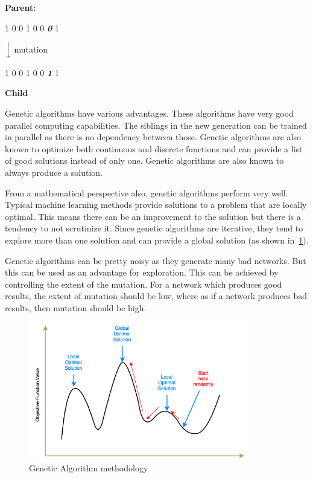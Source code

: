 \begin{itemize}
    \clearpage
    
    \textbf{Parent}: 
    
    1 0 0 1 0 0 \textbf{\textsl{0}} 1
    
    \qquad\quad\qquad$\Big\downarrow$ mutation
    
    1 0 0 1 0 0 \textbf{\textsl{1}} 1
    
    \textbf{Child}
    
\end{itemize}
    
    Genetic algorithms have various advantages. These algorithms have very good parallel computing capabilities. The siblings in the new generation can be trained in parallel as there is no dependency between those. Genetic algorithms are also known to optimize both continuous and discrete functions and can provide a list of good solutions instead of only one. Genetic algorithms are also known to always produce a solution.
    
    From a mathematical perspective also, genetic algorithms perform very well. Typical machine learning methods provide solutions to a problem that are locally optimal. This means there can be an improvement to the solution but there is a tendency to not scrutinize it. Since genetic algorithms are iterative, they tend to explore more than one solution and can provide a global solution (as shown in~\ref{fig:objective_function}).
    
    Genetic algorithms can be pretty noisy as they generate many bad networks. But this can be used as an advantage for exploration. This can be achieved by controlling the extent of the mutation. For a network which produces good results, the extent of mutation should be low, where as if a network produces bad results, then mutation should be high.
    
\begin{figure}[ht]
    \centering
    \includegraphics[width=1.0\linewidth, height=6cm]{BachelorMasterThesis/TheoreticalBackground/Figures/Objective_Function.png}
    \caption{Genetic Algorithm methodology}
    \label{fig:objective_function}
\end{figure}

